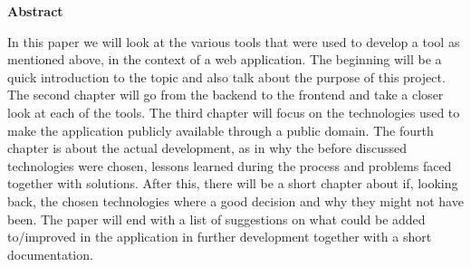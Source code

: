 \newpage

\vspace*{1cm}

\begin{center}
    \textbf{Abstract}
\end{center}

\vspace*{1cm}

\noindent
In this paper we will look at the various tools that were used to develop a tool as mentioned above, in the context of a web application. The beginning will be a quick introduction to the topic and also talk about the purpose of this project. The second chapter will go from the backend to the frontend and take a closer look at each of the tools. The third chapter will focus on the technologies used to make the application publicly available through a public domain. The fourth chapter is about the actual development, as in why the before discussed technologies were chosen, lessons learned during the process and problems faced together with solutions. After this, there will be a short chapter about if, looking back, the chosen technologies where a good decision and why they might not have been. The paper will end with a list of suggestions on what could be added to/improved in the application in further development together with a short documentation.
